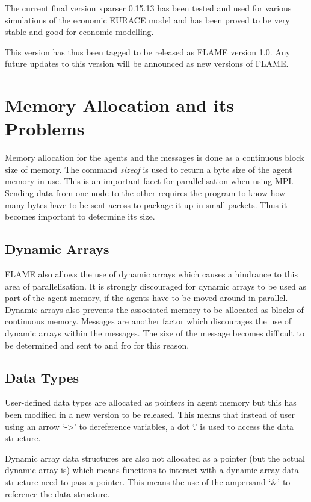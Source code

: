 The current final version xparser 0.15.13 has been tested and used for various simulations of the economic EURACE model and has been proved to be very stable and good for economic modelling.

This version has thus been tagged to be released as FLAME version 1.0. Any future updates to this version will be announced as new versions of FLAME.

\section{Memory Allocation and its Problems}

Memory allocation for the agents and the messages is done as a continuous block size of memory.
The command \emph{sizeof} is used to return a byte size of the agent memory in use.
This is an important facet for parallelisation when using MPI. Sending data from one node to the other requires the program to know how many bytes have to be sent across to package it up in small packets. Thus it becomes important to determine its size.

\subsection{Dynamic Arrays}
FLAME also allows the use of dynamic arrays which causes a hindrance to this area of parallelisation. It is strongly discouraged for dynamic arrays to be used as part of the agent memory, if the agents have to be moved around in parallel. Dynamic arrays also prevents the associated memory to be allocated as blocks of continuous memory. Messages are another factor which discourages the use of dynamic arrays within the messages. The size of the message becomes difficult to be determined and sent to and fro for this reason.

\subsection{Data Types}

User-defined data types are allocated as pointers in agent memory but
this has been modified in a new version to be released. This means that instead
of user using an arrow `-\textgreater' to dereference variables, a dot `.' is
used to access the data structure.

Dynamic array data structures are also not allocated as a pointer (but the actual
dynamic array is) which means functions to interact with a dynamic array data
structure need to pass a pointer. This means the use of the ampersand `\&' to
reference the data structure.

